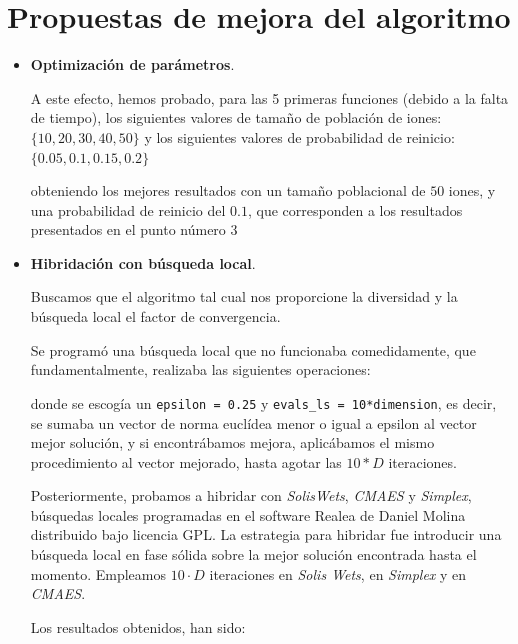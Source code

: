\documentclass[a4paper,11pt]{article}
\begin{document}
\section{Propuestas de mejora del algoritmo}
\begin{itemize}
 \item \textbf{Optimización de parámetros}.
 
 A este efecto, hemos probado, para las 5 primeras funciones (debido a la falta de tiempo), los siguientes valores de tamaño
 de población de iones: $\big\{10, 20, 30, 40, 50\big\}$ y los siguientes valores de probabilidad de reinicio: $\big\{0.05, 0.1, 0.15, 0.2\big\}$
 
 obteniendo los mejores resultados con un tamaño poblacional de $50$ iones, y una probabilidad de reinicio del $0.1$, que corresponden
 a los resultados presentados en el punto número 3
 
 \item \textbf{Hibridación con búsqueda local}.
 
 Buscamos que el algoritmo tal cual nos proporcione la diversidad y la búsqueda local el factor de convergencia. 
 
 
 Se programó una búsqueda local que no funcionaba comedidamente, que fundamentalmente, realizaba las siguientes operaciones:
 
  \small{\texttt{}}
  \normalsize
  
  donde se escogía un \texttt{epsilon = 0.25} y \texttt{evals\_ls = 10*dimension}, es decir, se sumaba un vector de norma euclídea
  menor o igual a epsilon al vector mejor solución, y si encontrábamos mejora, aplicábamos el mismo procedimiento al vector mejorado,
  hasta agotar las $10*D$ iteraciones.
  
 Posteriormente, probamos a hibridar con \textit{SolisWets}, \textit{CMAES} y \textit{Simplex}, búsquedas locales programadas en el software Realea de Daniel Molina distribuido
 bajo licencia GPL. La estrategia para hibridar fue introducir una búsqueda local en fase sólida sobre la mejor solución
 encontrada hasta el momento. Empleamos $10\cdot D$ iteraciones en \textit{Solis Wets}, en \textit{Simplex} y en \textit{CMAES}.
 
 
 Los resultados obtenidos, han sido:
 

\end{itemize}
\end{document}

